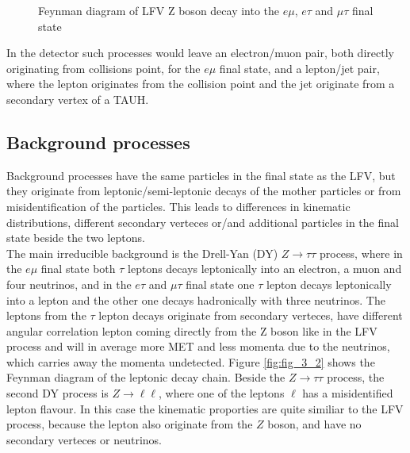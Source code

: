 \begin{figure}[htp]
	
	\caption[Feynman diagram of LFV Z boson decay]{Feynman diagram of LFV Z boson decay into the $e\mu$, $e\tau$ and $\mu\tau$ final state}
	\label{fig:fig_3_1}

\end{figure}

In the detector such processes would leave an electron/muon pair, both directly originating from collisions point, for the $e\mu$ final state, and a lepton/jet pair, where the lepton originates from the collision point and the jet originate from a secondary vertex of a \gls{TAUH}.  

\subsection{Background processes}

Background processes have the same particles in the final state as the \gls{LFV}, but they originate from leptonic/semi-leptonic decays of the mother particles or from misidentification of the particles. This leads to differences in kinematic distributions, different secondary verteces or/and additional particles in the final state beside the two leptons. \\

The main irreducible background is the Drell-Yan (\gls{DY}) $Z\to\tau\tau$ process, where in the $e\mu$ final state both $\tau$ leptons decays leptonically into an electron, a muon and four neutrinos, and in the $e\tau$ and $\mu\tau$ final state one $\tau$ lepton decays leptonically into a lepton and the other one decays hadronically with three neutrinos. The leptons from the $\tau$ lepton decays originate from secondary verteces, have different angular correlation lepton coming directly from the Z boson like in the \gls{LFV} process and will in average more \gls{MET} and less momenta due to the neutrinos, which carries away the momenta undetected. Figure \ref{fig:fig_3_2} shows the Feynman diagram of the leptonic decay chain. Beside the $Z\to\tau\tau$ process, the second \gls{DY} process is $Z\to\ell\ell$, where one of the leptons $\ell$ has a misidentified lepton flavour. In this case the kinematic proporties are quite similiar to the \gls{LFV} process, because the lepton also originate from the $Z$ boson, and have no secondary verteces or neutrinos. \\


